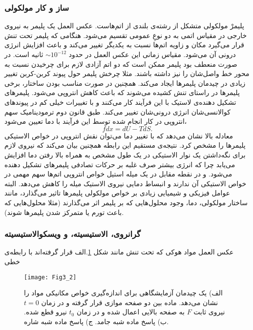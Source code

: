\subsubsection{ساز و کار مولکولی}
پلیمرْ مولکولی متشکل از رشته‌ی بلندی از اتم‌هاست. عکس العمل یک پلیمر به نیروی خارجی در مقیاس اتمی به دو نوعِ عمومی تقسیم می‌شود. هنگامی که پلیمر تحت تنش قرار می‌گیرد مکان و زاویه اتم‌ها  نسبت به یکدیگر تغییر می‌کند و باعث افزایش انرژی درونی‌ آن می‌شود. مقیاس زمانی این عکس العمل در حدود $\sim10^{-12}$ ثانیه است. در صورت منعطف بود پلیمر  ممکن است که دو اتم آزادی لازم برای چرخیدن نسبت به محور خط واصل‌شان را نیز داشته باشند. مثلا چرخش پلیمر حول پیوند‌ کربن-کربن تغییر زیادی در چیدمان پلیمر‌ها ایجاد می‌کند. همچنین در صورت مناسب بودن ساختار، برخی پلیمر‌ها در راستای تنش کشیده می‌شوند که باعث کاهش انتروپی  می‌شود. پلیمر‌های تشکیل دهنده‌ی لاستیک‌ با این فرآیند کار می‌کنند و با تغییرات خیلی کم در پیوند‌های کوالانسی‌شان انرژی درونی‌شان تغییر می‌کند. طبق قانون دوم ترمودینامیک سهم انتروپی در کار انجام شده توسط این فرآیند با دما تعیین می‌شود،
\begin{equation}
fdx=dU-TdS.\label{eq:second_thermo}
\end{equation}
معادله بالا نشان می‌دهد که با تغییر دما می‌توان نقش انتروپی در خواص الاستیکی پلیمر‌ها را مشخص کرد. نتیجه‌ی مستقیم این رابطه همچنین بیان می‌کند که نیروی لازم برای نگه‌داشتن یک نوار الاستیکی در یک طول مشخص به همراه بالا رفتن دما افزایش می‌یابد چرا که انرژی بیشتر صرف غلبه بر حرکات تصادفی پلیمر‌های تشکیل دهنده می‌شود. و در نقطه مقابل در یک میله استیل خواص انتروپی اتم‌ها سهم مهمی در خواص الاستیکی آن ندارند و انبساط دمایی نیروی الاستیک میله را کاهش می‌دهد.
البته عوامل فیزیکی و شیمیایی زیادی بر خواص مولکولی پلیمر‌ها تاثیر می‌گذارد، مانند ساختار مولکولی، دما، وجود محلول‌هایی که بر پلیمر اثر ‌می‌گذارند (مثلا محلول‌هایی که باعث تورم یا متمرکز شدن پلیمر‌ها شوند).  
\subsubsection{گرانروی، الاستیسیته،  و ویسکوالاستیسیته}
عکس العمل مواد هوکی که تحت تنش مانند شکل \ref{fig:3.2}.الف قرار گرفته‌اند  با رابطه‌ی خطی 
\begin{figure}[htbp]
\begin{center}
\texttt{[image: Fig3\_2]}
\caption{
الف) یک چیدمان آزمایشگاهی برای اندازه‌گیری خواص مکانیکی مواد را نشان می‌دهد. ماده بین دو صفحه موازی قرار گرفته و در زمان $t=0$  نیروی ثابت $F$ به صفحه بالایی اعمال شده و در زمان $t_0$ نیرو قطع شده‌. ب) پاسخ ماده شبه جامد. ج) پاسخ ماده شبه شاره.
}
\label{fig:3.2}
\end{center}
\end{figure}


